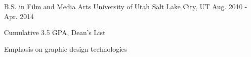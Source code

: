 

\begin{cventries}

  \cventry
    {B.S. in Film and Media Arts} %
    {University of Utah} %
    {Salt Lake City, UT} %
    {Aug. 2010 - Apr. 2014} %
    {
      \begin{cvitems} %
        \item {Cumulative 3.5 GPA, Dean's List}
        \item {Emphasis on graphic design technologies}
      \end{cvitems}
    }

\end{cventries}
